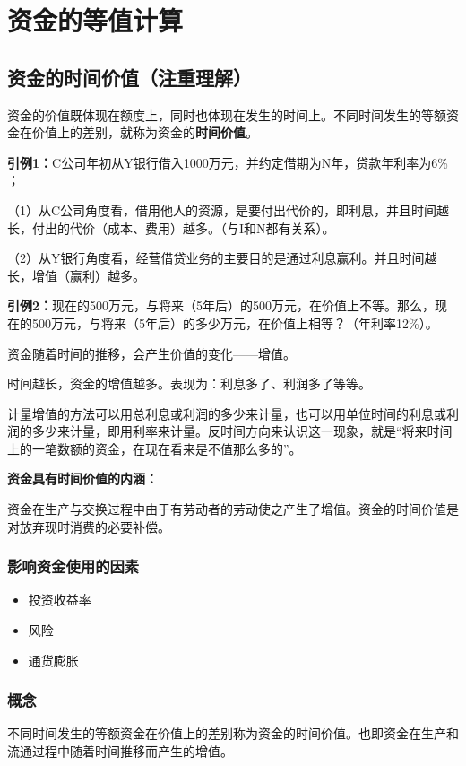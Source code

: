 \chapter{资金的等值计算}
\section{资金的时间价值（注重理解）}
资金的价值既体现在额度上，同时也体现在发生的时间上。不同时间发生的等额资金在价值上的差别，就称为资金的\textbf{时间价值}。

\textbf{引例1：}C公司年初从Y银行借入1000万元，并约定借期为N年，贷款年利率为6\% ；

（1）从C公司角度看，借用他人的资源，是要付出代价的，即利息，并且时间越长，付出的代价（成本、费用）越多。（与I和N都有关系）。

（2）从Y银行角度看，经营借贷业务的主要目的是通过利息赢利。并且时间越长，增值（赢利）越多。

\textbf{引例2：}现在的500万元，与将来（5年后）的500万元，在价值上不等。那么，现在的500万元，与将来（5年后）的多少万元，在价值上相等？（年利率12\%）。

资金随着时间的推移，会产生价值的变化——增值。

时间越长，资金的增值越多。表现为：利息多了、利润多了等等。

计量增值的方法可以用总利息或利润的多少来计量，也可以用单位时间的利息或利润的多少来计量，即用利率来计量。反时间方向来认识这一现象，就是“将来时间上的一笔数额的资金，在现在看来是不值那么多的”。

\textbf{资金具有时间价值的内涵：}

资金在生产与交换过程中由于有劳动者的劳动使之产生了增值。资金的时间价值是对放弃现时消费的必要补偿。

\subsection{影响资金使用的因素}

\begin{itemize}
    \item 投资收益率
    \item 风险
    \item 通货膨胀
\end{itemize}

\subsection{概念}
不同时间发生的等额资金在价值上的差别称为资金的时间价值。也即资金在生产和流通过程中随着时间推移而产生的增值。

